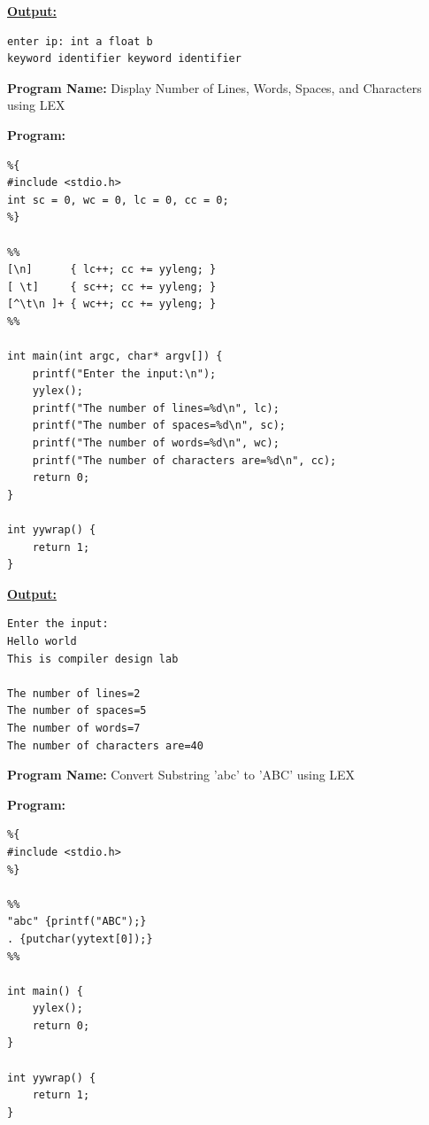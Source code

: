 \documentclass[11pt,a4paper]{article}
\begin{document}
\vspace{0.6em}
\noindent\textbf{\underline{Output:}}\par\vspace{0.4em}
\begin{lstlisting}
enter ip: int a float b
keyword identifier keyword identifier
\end{lstlisting}

\clearpage
\noindent\textbf{\large Program Name:} Display Number of Lines, Words, Spaces, and Characters using LEX\par\vspace{0.6em}
\noindent\textbf{\large Program:}\par\vspace{0.3em}
\begin{lstlisting}
%{
#include <stdio.h>
int sc = 0, wc = 0, lc = 0, cc = 0;
%}

%%
[\n]      { lc++; cc += yyleng; }
[ \t]     { sc++; cc += yyleng; }
[^\t\n ]+ { wc++; cc += yyleng; }
%%

int main(int argc, char* argv[]) {
    printf("Enter the input:\n");
    yylex();
    printf("The number of lines=%d\n", lc);
    printf("The number of spaces=%d\n", sc);
    printf("The number of words=%d\n", wc);
    printf("The number of characters are=%d\n", cc);
    return 0;
}

int yywrap() {
    return 1;
}
\end{lstlisting}

\vspace{0.6em}
\noindent\textbf{\underline{Output:}}\par\vspace{0.4em}
\begin{lstlisting}
Enter the input:
Hello world
This is compiler design lab

The number of lines=2
The number of spaces=5
The number of words=7
The number of characters are=40
\end{lstlisting}

\clearpage
\noindent\textbf{\large Program Name:} Convert Substring 'abc' to 'ABC' using LEX\par\vspace{0.6em}
\noindent\textbf{\large Program:}\par\vspace{0.3em}
\begin{lstlisting}
%{
#include <stdio.h>
%}

%%
"abc" {printf("ABC");}
. {putchar(yytext[0]);}
%%

int main() {
    yylex();
    return 0;
}

int yywrap() {
    return 1;
}
\end{lstlisting}
\end{document}
